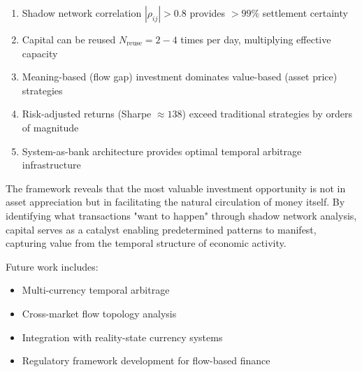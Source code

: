 \documentclass[12pt]{article}
\begin{document}
\begin{enumerate}
    \item Shadow network correlation $|\rho_{ij}| > 0.8$ provides $>99\%$ settlement certainty
    \item Capital can be reused $N_{\text{reuse}} = 2-4$ times per day, multiplying effective capacity
    \item Meaning-based (flow gap) investment dominates value-based (asset price) strategies
    \item Risk-adjusted returns (Sharpe $\approx 138$) exceed traditional strategies by orders of magnitude
    \item System-as-bank architecture provides optimal temporal arbitrage infrastructure
\end{enumerate}

The framework reveals that the most valuable investment opportunity is not in asset appreciation but in facilitating the natural circulation of money itself. By identifying what transactions "want to happen" through shadow network analysis, capital serves as a catalyst enabling predetermined patterns to manifest, capturing value from the temporal structure of economic activity.

Future work includes:
\begin{itemize}
    \item Multi-currency temporal arbitrage
    \item Cross-market flow topology analysis
    \item Integration with reality-state currency systems
    \item Regulatory framework development for flow-based finance
\end{itemize}
\end{document}
